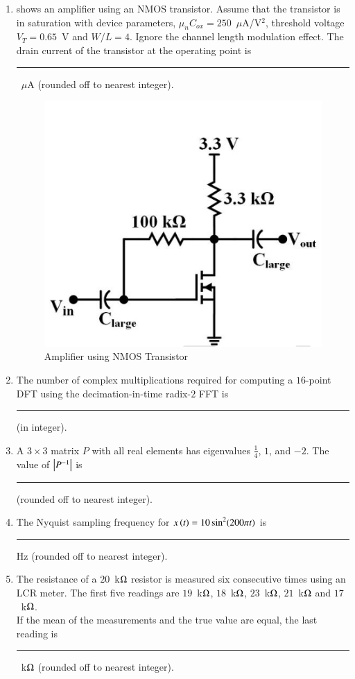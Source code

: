 \documentclass[journal,12pt,onecolumn]{IEEEtran}
\theoremstyle{remark}
\begin{document}
\begin{enumerate}
\item {} shows an amplifier using an NMOS transistor. Assume that the transistor is in saturation with device parameters, $\mu_n C_{ox} = 250$~$\mu$A/V$^2$, threshold voltage $V_T=0.65$~V and $W/L = 4$. Ignore the channel length modulation effect. The drain current of the transistor at the operating point is \rule{1.5cm}{0.4pt}~$\mu$A (rounded off to nearest integer).
\par\hfill{}
\begin{figure}[H]
    \centering
    \includegraphics[width=0.5\columnwidth]{Figs/Q-24.png}
    \caption{Amplifier using NMOS Transistor}
    \label{24}
\end{figure}

\item The number of complex multiplications required for computing a $16$-point DFT using the decimation-in-time radix-$2$ FFT is \rule{1.5cm}{0.4pt} (in integer).
\par\hfill{}

\item A $3\times 3$ matrix $P$ with all real elements has eigenvalues $\frac{1}{4}$, $1$, and $-2$. The value of $\abs{P^{-1}}$ is \rule{1.5cm}{0.4pt} (rounded off to nearest integer).
\par\hfill{}

\item The Nyquist sampling frequency for $x\brak{t} = 10\sin^2(200\pi t)$ is \rule{1.5cm}{0.4pt} Hz (rounded off to nearest integer).
\par\hfill{}

\item The resistance of a $20$~k$\ohm$ resistor is measured six consecutive times using an LCR meter. The first five readings are $19$~k$\ohm$, $18$~k$\ohm$, $23$~k$\ohm$, $21$~k$\ohm$ and $17$~k$\ohm$.\\
If the mean of the measurements and the true value are equal, the last reading is \rule{1.5cm}{0.4pt}~k$\ohm$ (rounded off to nearest integer).
\par\hfill{}


\end{enumerate}
\end{document}
